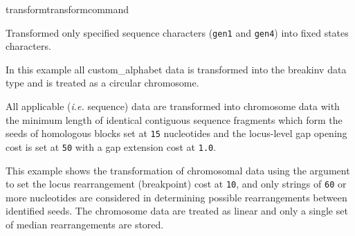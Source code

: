 \begin{command}{transform}{transformcommand}
\begin{poyexamples}
           	{Transformed only specified sequence characters (\texttt{gen1} and
           	\texttt{gen4}) into fixed states characters.}
           
           	{In this example all custom\_alphabet data is transformed into the breakinv data type 
		and is treated as a circular chromosome.}
          
          	{All applicable (\emph{i.e.} sequence) data are transformed into chromosome
          	data with the minimum length of identical contiguous sequence fragments which form
	          the seeds of homologous blocks set at  \texttt{15} nucleotides and the locus-level gap
	         opening cost is set at \texttt{50} with a gap extension cost at \texttt{1.0}.}
              
             	{This example shows the transformation of chromosomal data using the argument 
		to set the locus rearrangement (breakpoint) cost at \texttt{10}, and only strings of \texttt{60} or more nucleotides 
		are considered in determining possible rearrangements between identified seeds.  The chromosome data are
		treated as linear and only a single set of median rearrangements are stored.}
            
	\end{poyexamples}	    

\end{command}


